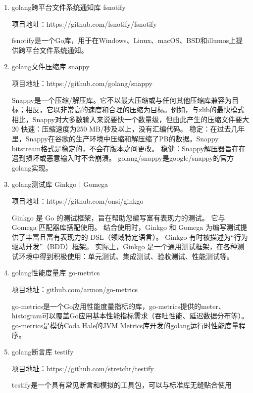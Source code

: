 	\begin{enumerate}[fullwidth,itemindent=2em,listparindent=2em]
	
		\item golang跨平台文件系统通知库 fsnotify
		
		项目地址：https://github.com/fsnotify/fsnotify

		fsnotify是一个Go库，用于在Windows、Linux、macOS、BSD和illumos上提供跨平台文件系统通知。

		\item golang文件压缩库 snappy
		
		项目地址：https://github.com/golang/snappy

		Snappy是一个压缩/解压库。它不以最大压缩或与任何其他压缩库兼容为目标；相反，它以非常高的速度和合理的压缩为目标。例如，与zlib的最快模式相比，Snappy对大多数输入来说要快一个数量级，但由此产生的压缩文件要大20%
		快速：压缩速度为250 MB/秒及以上，没有汇编代码。
		稳定：在过去几年里，Snappy在谷歌的生产环境中压缩和解压缩了PB的数据。Snappy bitstream格式是稳定的，不会在版本之间更改。
		稳健：Snappy解压器旨在在遇到损坏或恶意输入时不会崩溃。
		golang/snappy是google/snappy的官方golang实现。

		\item golang测试库 Ginkgo｜Gomega
		
		项目地址：https://github.com/onsi/ginkgo

		Ginkgo 是 Go 的测试框架，旨在帮助您编写富有表现力的测试。 它与 Gomega 匹配器库搭配使用。 结合使用时，Ginkgo 和 Gomega 为编写测试提供了丰富且富有表现力的 DSL（领域特定语言）。
		Ginkgo 有时被描述为“行为驱动开发”（BDD）框架。 实际上，Ginkgo 是一个通用测试框架，在各种测试环境中得到积极使用：单元测试、集成测试、验收测试、性能测试等。
		
		\item golang性能度量库 go-metrics
		
		项目地址：github.com/armon/go-metrics 
		
		go-metrics是一个Go应用性能度量指标的库，go-metrics提供的meter、histogram可以覆盖Go应用基本性能指标需求（吞吐性能、延迟数据分布等）。
		go-metrics是模仿Coda Hale的JVM Metrics库开发的golang运行时性能度量程序。
		
		
		\item golang断言库 testify
		
		项目地址：https://github.com/stretchr/testify

		testify是一个具有常见断言和模拟的工具包，可以与标准库无缝贴合使用
		

	\end{enumerate}
	
	
\clearpage